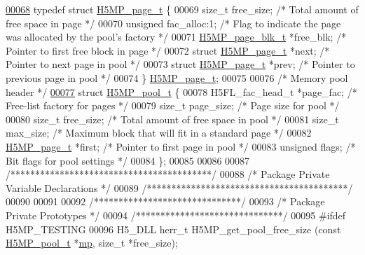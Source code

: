 \begin{DoxyCode}
\hyperlink{struct_h5_m_p__page__t}{00068} \textcolor{keyword}{typedef} \textcolor{keyword}{struct }\hyperlink{struct_h5_m_p__page__t}{H5MP\_page\_t} \{
00069     \textcolor{keywordtype}{size\_t} free\_size;                   \textcolor{comment}{/* Total amount of free space in page */}
00070     \textcolor{keywordtype}{unsigned} fac\_alloc:1;               \textcolor{comment}{/* Flag to indicate the page was allocated by the pool's factory */}
00071     \hyperlink{struct_h5_m_p__page__blk__t}{H5MP\_page\_blk\_t} *free\_blk;          \textcolor{comment}{/* Pointer to first free block in page */}
00072     \textcolor{keyword}{struct }\hyperlink{struct_h5_m_p__page__t}{H5MP\_page\_t} *next;           \textcolor{comment}{/* Pointer to next page in pool */}
00073     \textcolor{keyword}{struct }\hyperlink{struct_h5_m_p__page__t}{H5MP\_page\_t} *prev;           \textcolor{comment}{/* Pointer to previous page in pool */}
00074 \} \hyperlink{struct_h5_m_p__page__t}{H5MP\_page\_t};
00075 
00076 \textcolor{comment}{/* Memory pool header */}
\hyperlink{struct_h5_m_p__pool__t}{00077} \textcolor{keyword}{struct }\hyperlink{struct_h5_m_p__pool__t}{H5MP\_pool\_t} \{
00078     H5FL\_fac\_head\_t *page\_fac;  \textcolor{comment}{/* Free-list factory for pages */}
00079     \textcolor{keywordtype}{size\_t} page\_size;           \textcolor{comment}{/* Page size for pool */}
00080     \textcolor{keywordtype}{size\_t} free\_size;           \textcolor{comment}{/* Total amount of free space in pool */}
00081     \textcolor{keywordtype}{size\_t} max\_size;            \textcolor{comment}{/* Maximum block that will fit in a standard page */}
00082     \hyperlink{struct_h5_m_p__page__t}{H5MP\_page\_t} *first;         \textcolor{comment}{/* Pointer to first page in pool */}
00083     \textcolor{keywordtype}{unsigned} flags;             \textcolor{comment}{/* Bit flags for pool settings */}
00084 \};
00085 
00086 
00087 \textcolor{comment}{/*****************************************/}
00088 \textcolor{comment}{/* Package Private Variable Declarations */}
00089 \textcolor{comment}{/*****************************************/}
00090 
00091 
00092 \textcolor{comment}{/******************************/}
00093 \textcolor{comment}{/* Package Private Prototypes */}
00094 \textcolor{comment}{/******************************/}
00095 \textcolor{preprocessor}{#ifdef H5MP\_TESTING}
00096 H5\_DLL herr\_t H5MP\_get\_pool\_free\_size (\textcolor{keyword}{const} \hyperlink{struct_h5_m_p__pool__t}{H5MP\_pool\_t} *\hyperlink{namespaceboost_1_1multiprecision}{mp}, \textcolor{keywordtype}{size\_t} *free\_size);

\end{DoxyCode}

